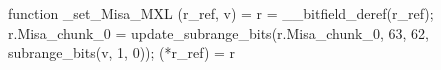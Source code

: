 function _set_Misa_MXL (r_ref, v) = {
    r = __bitfield_deref(r_ref);
    r.Misa_chunk_0 = update_subrange_bits(r.Misa_chunk_0, 63, 62, subrange_bits(v, 1, 0));
    (*r_ref) = r
}

